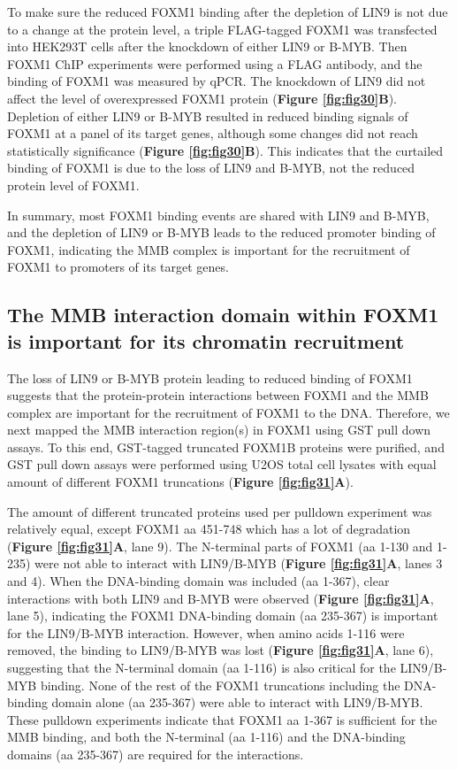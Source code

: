 To make sure the reduced FOXM1 binding after the depletion of LIN9 is not due to a change at the protein level, a triple FLAG-tagged FOXM1 was transfected into HEK293T cells after the knockdown of either LIN9 or B-MYB. Then FOXM1 ChIP experiments were performed using a FLAG antibody, and the binding of FOXM1 was measured by qPCR. The knockdown of LIN9 did not affect the level of overexpressed FOXM1 protein (\textbf{Figure \ref{fig:fig30}B}). Depletion of either LIN9 or B-MYB resulted in reduced binding signals of FOXM1 at a panel of its target genes, although some changes did not reach statistically significance (\textbf{Figure \ref{fig:fig30}B}). This indicates that the curtailed binding of FOXM1 is due to the loss of LIN9 and B-MYB, not the reduced protein level of FOXM1.

In summary, most FOXM1 binding events are shared with LIN9 and B-MYB, and the depletion of LIN9 or B-MYB leads to the reduced promoter binding of FOXM1, indicating the MMB complex is important for the recruitment of FOXM1 to promoters of its target genes.

\subsection{The MMB interaction domain within FOXM1 is important for its chromatin recruitment}

The loss of LIN9 or B-MYB protein leading to reduced binding of FOXM1 suggests that the protein-protein interactions between FOXM1 and the MMB complex are important for the recruitment of FOXM1 to the DNA. Therefore, we next mapped the MMB interaction region(s) in FOXM1 using GST pull down assays. To this end, GST-tagged truncated FOXM1B proteins were purified, and GST pull down assays were performed using U2OS total cell lysates with equal amount of different FOXM1 truncations (\textbf{Figure \ref{fig:fig31}A}).

The amount of different truncated proteins used per pulldown experiment was relatively equal, except FOXM1 aa 451-748 which has a lot of degradation (\textbf{Figure \ref{fig:fig31}A}, lane 9). The N-terminal parts of FOXM1 (aa 1-130 and 1-235) were not able to interact with LIN9/B-MYB (\textbf{Figure \ref{fig:fig31}A}, lanes 3 and 4). When the DNA-binding domain was included (aa 1-367), clear interactions with both LIN9 and B-MYB were observed (\textbf{Figure \ref{fig:fig31}A}, lane 5), indicating the FOXM1 DNA-binding domain (aa 235-367) is important for the LIN9/B-MYB interaction. However, when amino acids 1-116 were removed, the binding to LIN9/B-MYB was lost (\textbf{Figure \ref{fig:fig31}A}, lane 6), suggesting that the N-terminal domain (aa 1-116) is also critical for the LIN9/B-MYB binding. None of the rest of the FOXM1 truncations including the DNA-binding domain alone (aa 235-367) were able to interact with LIN9/B-MYB. These pulldown experiments indicate that FOXM1 aa 1-367 is sufficient for the MMB binding, and both the N-terminal (aa 1-116) and the DNA-binding domains (aa 235-367) are required for the interactions.

